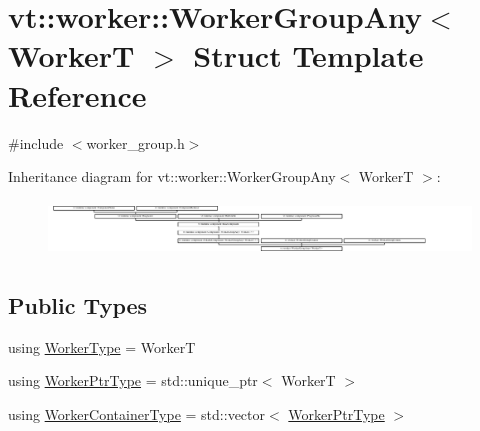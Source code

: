 \hypertarget{structvt_1_1worker_1_1_worker_group_any}{}\section{vt\+:\+:worker\+:\+:Worker\+Group\+Any$<$ WorkerT $>$ Struct Template Reference}
\label{structvt_1_1worker_1_1_worker_group_any}


{\ttfamily \#include $<$worker\+\_\+group.\+h$>$}

Inheritance diagram for vt\+:\+:worker\+:\+:Worker\+Group\+Any$<$ WorkerT $>$\+:\begin{figure}[H]
\begin{center}
\leavevmode
\includegraphics[height=1.483444cm]{structvt_1_1worker_1_1_worker_group_any}
\end{center}
\end{figure}
\subsection*{Public Types}
\begin{DoxyCompactItemize}
\item 
using \hyperlink{structvt_1_1worker_1_1_worker_group_any_af82b0c60f233e4ec668532ae46cda2e6}{Worker\+Type} = WorkerT
\item 
using \hyperlink{structvt_1_1worker_1_1_worker_group_any_a1c5f50479aa26bcea9491f5ca41138d7}{Worker\+Ptr\+Type} = std\+::unique\+\_\+ptr$<$ WorkerT $>$
\item 
using \hyperlink{structvt_1_1worker_1_1_worker_group_any_ad7e74c099f11c75bc35c838baedaa2cd}{Worker\+Container\+Type} = std\+::vector$<$ \hyperlink{structvt_1_1worker_1_1_worker_group_any_a1c5f50479aa26bcea9491f5ca41138d7}{Worker\+Ptr\+Type} $>$
\end{DoxyCompactItemize}

